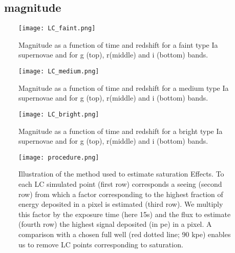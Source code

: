 \begin{appendices}
    
\section{\sne~magnitude}

\begin{figure}[htbp]
\begin{center}
  \texttt{[image: LC\_faint.png]}
 \caption{Magnitude as a function of time and redshift for a faint type Ia supernovae and for g (top), r(middle) and i (bottom) bands.}\label{fig:lcfaint}
\end{center}
\end{figure}

\begin{figure}[htbp]
\begin{center}
  \texttt{[image: LC\_medium.png]}
 \caption{Magnitude as a function of time and redshift for a medium type Ia supernovae and for g (top), r(middle) and i (bottom) bands.}\label{fig:lcmedium}
\end{center}
\end{figure}

\begin{figure}[htbp]
\begin{center}
  \texttt{[image: LC\_bright.png]}
 \caption{Magnitude as a function of time and redshift for a bright type Ia supernovae and for g (top), r(middle) and i (bottom) bands.}\label{fig:lcbright}
\end{center}
\end{figure}

\begin{figure}[htbp]
\begin{center}
  \texttt{[image: procedure.png]}
 \caption{Illustration of the method used to estimate saturation Effects. To each LC simulated point (first row) corresponds a seeing (second row) from which a factor corresponding to the highest fraction of energy deposited in a pixel is estimated (third row). We multiply this factor by the exposure time (here 15s) and the flux to estimate (fourth row) the highest signal deposited (in pe) in a pixel. A comparison with a chosen full well (red dotted line; 90 kpe) enables us to remove LC points corresponding to saturation.}\label{fig:method}
\end{center}
\end{figure}


\end{appendices}
